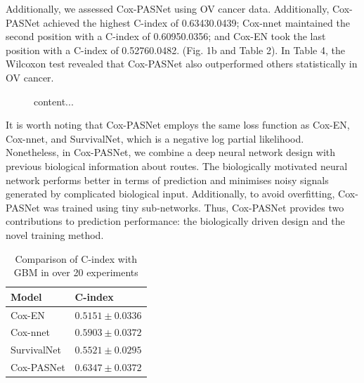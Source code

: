 \documentclass[10pt,twocolumn,twoside,lineno]{gsajnl}
\begin{document}
Additionally, we assessed Cox-PASNet using OV cancer data. Additionally, Cox-PASNet achieved the highest C-index of 0.63430.0439; Cox-nnet maintained the second position with a C-index of 0.60950.0356; and Cox-EN took the last position with a C-index of 0.52760.0482. (Fig. 1b and Table 2). In Table 4, the Wilcoxon test revealed that Cox-PASNet also outperformed others statistically in OV cancer.

\begin{figure}
	content...
\end{figure}

It is worth noting that Cox-PASNet employs the same loss function as Cox-EN, Cox-nnet, and SurvivalNet, which is a negative log partial likelihood. Nonetheless, in Cox-PASNet, we combine a deep neural network design with previous biological information about routes. The biologically motivated neural network performs better in terms of prediction and minimises noisy signals generated by complicated biological input. Additionally, to avoid overfitting, Cox-PASNet was trained using tiny sub-networks. Thus, Cox-PASNet provides two contributions to prediction performance: the biologically driven design and the novel training method.



\begin{table}[H]

	\caption{Comparison of C-index with GBM in over 20 experiments}
	\begin{tableminipage}{0.482\textwidth}
		\begin{tabularx}{\textwidth}{@{}XX@{}}
			\hline
			{\bf Model} & {\bf C-index}\\
			\hline
			Cox-EN & $ 0.5151 \pm 0.0336 $ \\
			Cox-nnet & $ 0.5903 \pm 0.0372 $ \\
			SurvivalNet & $ 0.5521 \pm 0.0295 $ \\
			Cox-PASNet & $ 0.6347 \pm 0.0372 $ \\
			\hline
		\end{tabularx}
		\label{tab:shape-functions}
	\end{tableminipage}
\end{table}
\end{document}
